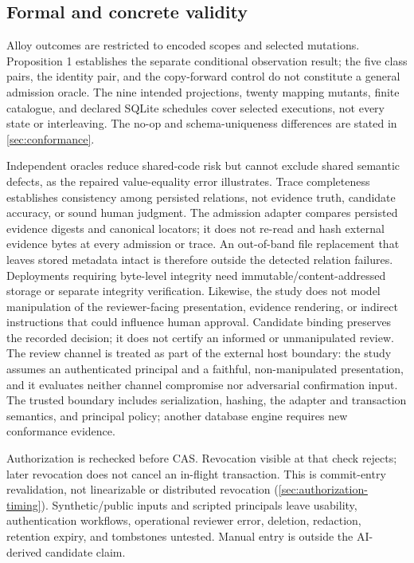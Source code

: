 \subsection{Formal and concrete validity}

Alloy outcomes are restricted to encoded scopes and selected mutations. Proposition 1 establishes the separate conditional observation result; the five class pairs, the identity pair, and the copy-forward control do not constitute a general admission oracle. The nine intended projections, twenty mapping mutants, finite catalogue, and declared SQLite schedules cover selected executions, not every state or interleaving. The no-op and schema-uniqueness differences are stated in \cref{sec:conformance}.

Independent oracles reduce shared-code risk but cannot exclude shared semantic defects, as the repaired value-equality error illustrates. Trace completeness establishes consistency among persisted relations, not evidence truth, candidate accuracy, or sound human judgment. The admission adapter compares persisted evidence digests and canonical locators; it does not re-read and hash external evidence bytes at every admission or trace. An out-of-band file replacement that leaves stored metadata intact is therefore outside the detected relation failures. Deployments requiring byte-level integrity need immutable/content-addressed storage or separate integrity verification. Likewise, the study does not model manipulation of the reviewer-facing presentation, evidence rendering, or indirect instructions that could influence human approval. Candidate binding preserves the recorded decision; it does not certify an informed or unmanipulated review. The review channel is treated as part of the external host boundary: the study assumes an authenticated principal and a faithful, non-manipulated presentation, and it evaluates neither channel compromise nor adversarial confirmation input. The trusted boundary includes serialization, hashing, the adapter and transaction semantics, and principal policy; another database engine requires new conformance evidence.

Authorization is rechecked before CAS. Revocation visible at that check rejects; later revocation does not cancel an in-flight transaction. This is commit-entry revalidation, not linearizable or distributed revocation (\cref{sec:authorization-timing}). Synthetic/public inputs and scripted principals leave usability, authentication workflows, operational reviewer error, deletion, redaction, retention expiry, and tombstones untested. Manual entry is outside the AI-derived candidate claim.

